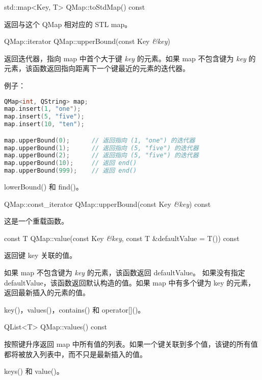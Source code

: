 \splitLine

std::map<Key, T> QMap::toStdMap() const

返回与这个 QMap 相对应的 STL map。

\splitLine

QMap::iterator QMap::upperBound(const Key \emph{\&key})

返回迭代器，指向 map 中首个大于键 \emph{key} 的元素。如果 map 不包含键为 \emph{key} 的元素，该函数返回指向距离下一个键最近的元素的迭代器。

例子：

\begin{lstlisting}[language=C++]
QMap<int, QString> map;
map.insert(1, "one");
map.insert(5, "five");
map.insert(10, "ten");

map.upperBound(0);      // 返回指向 (1, "one") 的迭代器
map.upperBound(1);      // 返回指向 (5, "five") 的迭代器
map.upperBound(2);      // 返回指向 (5, "five") 的迭代器
map.upperBound(10);     // 返回 end()
map.upperBound(999);    // 返回 end()
\end{lstlisting}

\begin{notice}[另请参阅]
lowerBound() 和 find()。
\end{notice}

QMap::const\_iterator QMap::upperBound(const Key \emph{\&key}) const

这是一个重载函数。

\splitLine

const T QMap::value(const Key \emph{\&key}, const T \&defaultValue = T()) const

返回键 key 关联的值。

如果 map 不包含键为 \emph{key} 的元素，该函数返回 defaultValue。 如果没有指定 defaultValue，该函数返回默认构造的值。如果 map 中有多个键为 key 的元素，返回最新插入的元素的值。

\begin{notice}[另请参阅]
key()，values()，contains() 和 operator[]()。
\end{notice}

\splitLine

QList<T> QMap::values() const

按照键升序返回 map 中所有值的列表。如果一个键关联到多个值，该键的所有值都将被放入列表中，而不只是最新插入的值。

\begin{notice}[另请参阅]
keys() 和 value()。
\end{notice}

